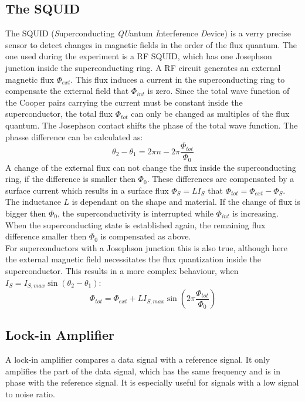 \subsection{The SQUID}
The SQUID (\emph{S}uperconducting \emph{QU}antum \emph{I}nterference \emph{D}evice) is a verry precise sensor to detect changes in magnetic fields in the order of the flux quantum. The one used during the experiment is a RF SQUID, which has one Josephson junction inside the superconducting ring. A RF circuit generates an external magnetic flux $\Phi_{ext}$. This flux induces a current in the superconducting ring to compensate the external field that $\Phi_{int}$ is zero. 
Since the total wave function of the Cooper pairs carrying the current must be constant inside the superconductor, the total flux $\Phi_{tot}$ can only be changed as multiples of the flux quantum. The Josephson contact shifts the phase of the total wave function. The phasse difference can be calculated as: $$ \theta_2 - \theta_1 = 2 \pi n -2\pi \frac{\Phi_{tot}}{\Phi_0}$$
A change of the external flux can not change the flux inside the superconducting ring, if the difference is smaller then $\Phi_0$. These differences are compensated by a surface current which results in a surface flux $\Phi_S = L I_S$ that $\Phi_{tot} = \Phi_{ext}-\Phi_S$. The inductance $L$ is dependant on the shape and material. 
If the change of flux is bigger then $\Phi_0$, the superconductivity is interrupted while $\Phi_{int}$ is increasing. When the superconducting state is established again, the remaining flux difference smaller then $\Phi_0$ is compensated as above.\\

For superconductors with a Josephson junction this is also true, although here the external magnetic field necessitates the flux quantization inside the superconductor. This results in a more complex behaviour, when $I_S = I_{S,max} \sin\left( \theta_2-\theta_1\right) $:
$$ \Phi_{tot}=\Phi_{ext} + L I_{S,max}\sin\left( 2\pi \frac{\Phi_{tot}}{\Phi_0}\right)$$

\subsection{Lock-in Amplifier}
A lock-in amplifier compares a data signal with a reference signal. It only amplifies the part of the data signal, which has the same frequency and is in phase with the reference signal. It is especially useful for signals with a low signal to noise ratio. 

